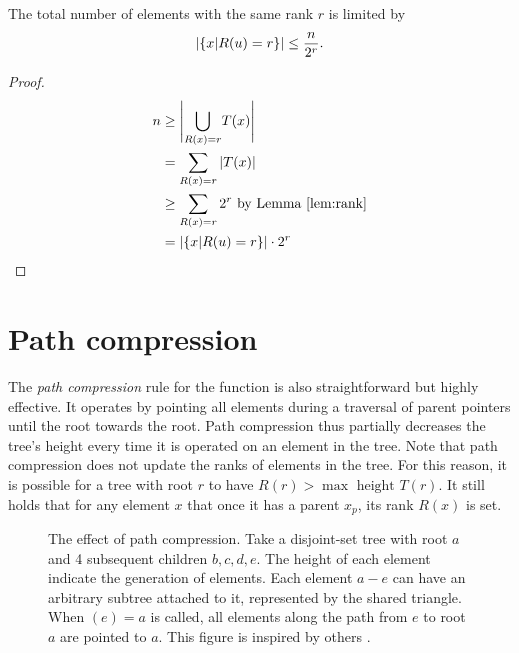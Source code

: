 \begin{lemma}\label{lem:noderank}
  The total number of elements with the same rank $r$ is limited by 
  \begin{equation}
      \abs{\{x | R(u)=r \}} \leq \frac{n}{2^r}.
  \end{equation}
\end{lemma}
\begin{proof}
    \begin{align*}
        n &\geq \Bigg| \underset{R(x)=r}{\bigcup} T(x) \Bigg| \\
        &= \sum_{R(x)=r} \abs{T(x)} \\
        &\geq \sum_{R(x)=r} 2^r \text{ by Lemma \ref{lem:rank}}\\
        &= \abs{\{x | R(u)=r\}}\cdot 2^r
    \end{align*}
\end{proof}

\section{Path compression}
The \emph{path compression} rule for the  function is also straightforward but highly effective. It operates by pointing all elements during a traversal of parent pointers until the root towards the root. Path compression thus partially decreases the tree's height every time it is operated on an element in the tree. Note that path compression does not update the ranks of elements in the tree. For this reason, it is possible for a tree with root $r$ to have $R(r) > \max \text{ height } T(r)$. It still holds that for any element $x$ that once it has a parent $x_p$, its rank $R(x)$ is set. 

\newcommand\DRAWTREE[3]{
  \node[fnode] at (#1,#2) (#3) {$#3$};
  \draw[lw1, fill=white!80!black] (#3.south) -- +(0.3,-1) -- +(-0.3,-1) -- cycle;
}
\begin{figure}[htpb]
  \centering
  \caption{The effect of path compression. Take a disjoint-set tree with root $a$ and 4 subsequent children $b,c,d,e$. The height of each element indicate the generation of elements. Each element $a-e$ can have an arbitrary subtree attached to it, represented by the shared triangle. When $(e)=a$ is called, all elements along the path from $e$ to root $a$ are pointed to $a$. This figure is inspired by others \cite{tarjan1975efficiency}.}
  \label{fig:pathcompression}
\end{figure}

